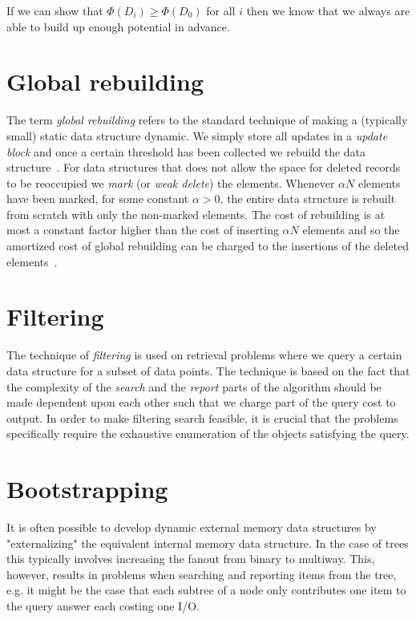 \documentclass[twoside,11pt,openright]{report}
\begin{document}
If we can show that $\Phi(D_i) \geq \Phi(D_0)$ for all $i$ then we know that we always are able to build up enough potential in advance.

\section{Global rebuilding}
The term \textit{global rebuilding} refers to the standard technique of making a (typically small) static data structure dynamic. We simply store all updates in a \textit{update block} and once a certain threshold has been collected we rebuild the data structure~\cite{ionote}. For data structures that does not allow the space for deleted records to be reoccupied we \textit{mark} (or \textit{weak delete}) the elements. Whenever $\alpha N$ elements have been marked, for some constant $\alpha > 0$, the entire data structure is rebuilt from scratch with only the non-marked elements. The cost of rebuilding is at most a constant factor higher than the cost of inserting $\alpha N$ elements and so the amortized cost of global rebuilding can be charged to the insertions of the deleted elements~\cite{Meyer:2003/AMH/1744652}.

\section{Filtering}
The technique of \textit{filtering} is used on retrieval problems where we query a certain data structure for a subset of data points. The technique is based on the fact that the complexity of the \textit{search} and the \textit{report} parts of the algorithm should be made dependent upon each other such that we charge part of the query cost to output. In order to make filtering search feasible, it is crucial that the problems specifically require the exhaustive enumeration of the objects satisfying the query.

\section{Bootstrapping}
It is often possible to develop dynamic external memory data structures by "externalizing" the equivalent internal memory data structure. In the case of trees this typically involves increasing the fanout from binary to multiway. This, however, results in problems when searching and reporting items from the tree, e.g. it might be the case that each subtree of a node only contributes one item to the query answer each costing one I/O.
\end{document}
